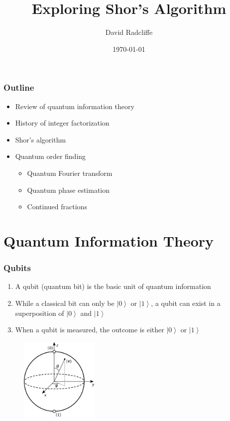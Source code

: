\documentclass{beamer}
\title{Exploring Shor's Algorithm}
\author{David Radcliffe}
\institute{MinneQuantum}
\date{\today}
\begin{document}
\newcommand{\ket}[1]{\left| #1 \right\rangle}

\frame{\titlepage}


\begin{frame}
    \frametitle{Outline}
    \begin{itemize}
        \item Review of quantum information theory
        \item History of integer factorization
        \item Shor's algorithm
        \item Quantum order finding
        \begin{itemize}
            \item Quantum Fourier transform
            \item Quantum phase estimation
            \item Continued fractions
        \end{itemize}
    \end{itemize}
    
\end{frame}

\section{Quantum Information Theory}

\begin{frame}
\frametitle{Qubits}

\begin{enumerate}
    \item A qubit (quantum bit) is the basic unit of quantum 
    information
    \item While a classical bit can only be $\ket0$ or $\ket1$, 
    a qubit can exist in a superposition of $\ket0$ and $\ket1$
    \item When a qubit is measured, the outcome is either 
    $\ket0$ or $\ket1$
\end{enumerate}
\begin{figure}
\includegraphics[height=4cm]{Bloch_sphere.svg.png}
\end{figure}
\end{frame}
\end{document}
